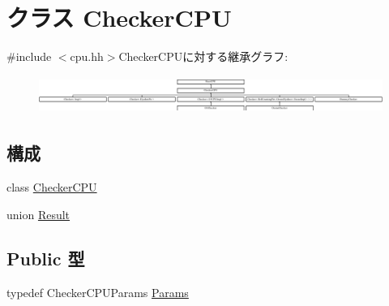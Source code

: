 \hypertarget{classCheckerCPU}{
\section{クラス CheckerCPU}
\label{classCheckerCPU}
}


{\ttfamily \#include $<$cpu.hh$>$}CheckerCPUに対する継承グラフ:\begin{figure}[H]
\begin{center}
\leavevmode
\includegraphics[height=1.23416cm]{classCheckerCPU}
\end{center}
\end{figure}
\subsection*{構成}
\begin{DoxyCompactItemize}
\item 
class \hyperlink{classCheckerCPU_1_1CheckerCPU}{CheckerCPU}
\item 
union \hyperlink{unionCheckerCPU_1_1Result}{Result}
\end{DoxyCompactItemize}
\subsection*{Public 型}
\begin{DoxyCompactItemize}
\item 
typedef CheckerCPUParams \hyperlink{classCheckerCPU_a56bf98a1e02b979e88cbf64420995961}{Params}
\end{DoxyCompactItemize}
